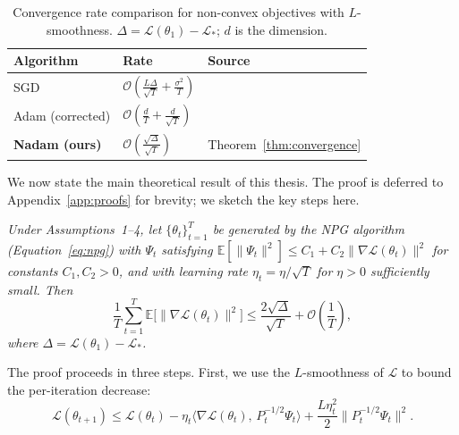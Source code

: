 \documentclass[11pt,twoside,openright]{book}
\begin{document}
\begin{table}[tb]
  \centering
  \caption{Convergence rate comparison for non-convex objectives with $L$-smoothness.
    $\Delta = \mathcal{L}(\theta_1) - \mathcal{L}_*$; $d$ is the dimension.}
  \label{tab:rates}
  \begin{tabular}{@{}lll@{}}
    \toprule
    \textbf{Algorithm} & \textbf{Rate} & \textbf{Source}\\
    \midrule
    SGD                     & $\mathcal{O}\!\left(\frac{L\Delta}{\sqrt{T}} + \frac{\sigma^2}{T}\right)$
                            & \cite{ghadimi2013}\\
    Adam (corrected)        & $\mathcal{O}\!\left(\frac{d}{T} + \frac{d}{\sqrt{T}}\right)$
                            & \cite{reddi2018}\\
    \textbf{Nadam (ours)}   & $\mathcal{O}\!\left(\frac{\sqrt{\Delta}}{\sqrt{T}}\right)$
                            & Theorem~\ref{thm:convergence}\\
    \bottomrule
  \end{tabular}
\end{table}

We now state the main theoretical result of this thesis. The proof is deferred to
Appendix~\ref{app:proofs} for brevity; we sketch the key steps here.

\begin{description}[leftmargin=2em,style=nextline]
  \item[Theorem 1 (NPG Convergence).] \emph{Under Assumptions~1--4, let $\{\theta_t\}_{t=1}^T$
    be generated by the NPG algorithm (Equation~\ref{eq:npg}) with $\Psi_t$ satisfying
    $\mathbb{E}[\|\Psi_t\|^2] \leq C_1 + C_2\|\nabla\mathcal{L}(\theta_t)\|^2$ for constants
    $C_1, C_2 > 0$, and with learning rate $\eta_t = \eta/\sqrt{T}$ for $\eta > 0$ sufficiently
    small. Then}
    \begin{equation}
      \frac{1}{T}\sum_{t=1}^{T} \mathbb{E}\bigl[\|\nabla\mathcal{L}(\theta_t)\|^2\bigr]
        \leq \frac{2\sqrt{\Delta}}{\sqrt{T}} + \mathcal{O}\!\left(\frac{1}{T}\right),
      \label{eq:thm1}
    \end{equation}
    \emph{where $\Delta = \mathcal{L}(\theta_1) - \mathcal{L}_*$.}
    \label{thm:convergence}
\end{description}

The proof proceeds in three steps. First, we use the $L$-smoothness of $\mathcal{L}$ to
bound the per-iteration decrease:
\begin{equation}
  \mathcal{L}(\theta_{t+1}) \leq \mathcal{L}(\theta_t)
    - \eta_t \langle\nabla\mathcal{L}(\theta_t),\, P_t^{-1/2}\Psi_t\rangle
    + \frac{L\eta_t^2}{2}\|P_t^{-1/2}\Psi_t\|^2.
  \label{eq:smoothness}
\end{equation}
\end{document}
